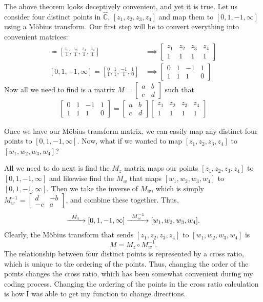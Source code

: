 \documentclass[12pt,a4paper,reqno,parskip=full]{amsart}
\numberwithin{equation}{section}
\theoremstyle{plain}
\theoremstyle{definition}
\def\C{{\mathbb C}}
\begin{document}
The above theorem looks deceptively convenient, and yet it is true. Let us consider four distinct points in $\hat\C$, $[z_1,z_2,z_3,z_4]$ and map them to $[0,1,-1,\infty]$ using a Möbius transform. Our first step will be to convert everything into convenient matrices:
\begin{align*}
[z_1,z_2,z_3,z_4]=\left[\frac{z_1}{1},\frac{z_2}{1},\frac{z_3}{1},\frac{z_4}{1}\right]
&\implies
\begin{bmatrix}z_1 & z_2 & z_3 & z_4 \\ 1 & 1 & 1 & 1\end{bmatrix}\\
[0,1,-1,\infty]=\left[\frac{0}{1},\frac{1}{1},\frac{-1}{1},\frac{1}{0}\right]
&\implies
\begin{bmatrix}0 & 1 & -1 & 1\\ 1 & 1 & 1 & 0\end{bmatrix}
\end{align*}
Now all we need to find is a matrix $M=\begin{bmatrix}a&b\\c&d\end{bmatrix}$ such that
\begin{align*}
\begin{bmatrix}0 & 1 & -1 & 1\\ 1 & 1 & 1 & 0\end{bmatrix}=
\begin{bmatrix}a&b\\c&d\end{bmatrix}
\begin{bmatrix}z_1 & z_2 & z_3 & z_4 \\ 1 & 1 & 1 & 1\end{bmatrix}
\end{align*}

Once we have our Möbius transform matrix, we can easily map any distinct four points to $[0,1,-1,\infty]$. Now, what if we wanted to map $[z_1,z_2,z_3,z_4]$ to $[w_1,w_2,w_3,w_4]$?

All we need to do next is find the $M_z$ matrix maps our points $[z_1,z_2,z_3,z_4]$ to $[0,1,-1,\infty]$ and likewise find the $M_w$ that maps $[w_1,w_2,w_3,w_4]$ to $[0,1,-1,\infty]$. Then we take the inverse of $M_w$, which is simply $M_w^{-1}=\left[\begin{smallmatrix}d&-b\\-c&a\end{smallmatrix}\right]$, and combine these together. Thus,
\begin{align*}
[z_1,z_2,z_3,z_4]\xrightarrow{\text{\;\;$M_z$\;\;}}[0,1,-1,\infty]\xrightarrow{\text{\;\;$M_w^{-1}$\;}}[w_1,w_2,w_3,w_4].
\end{align*}
 Clearly, the Möbius transform that sends $[z_1,z_2,z_3,z_4]$ to $[w_1,w_2,w_3,w_4]$ is
\[M=M_z\circ M_w^{-1}.\]
The relationship between four distinct points is represented by a cross ratio, which is unique to the ordering of the points. Thus, changing the order of the points changes the cross ratio, which has been somewhat convenient during my coding process. Changing the ordering of the points in the cross ratio calculation is how I was able to get my function to change directions.
\end{document}

